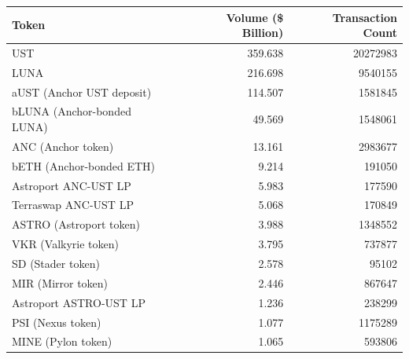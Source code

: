 \begin{center}
    \begin{tabular}{lrr}
        \toprule
        Token                      & Volume (\$ Billion) & Transaction Count \\
        \midrule
        UST                        & 359.638             & 20272983          \\
        LUNA                       & 216.698             & 9540155           \\
        aUST (Anchor UST deposit)  & 114.507             & 1581845           \\
        bLUNA (Anchor-bonded LUNA) & 49.569              & 1548061           \\
        ANC (Anchor token)         & 13.161              & 2983677           \\
        bETH (Anchor-bonded ETH)   & 9.214               & 191050            \\
        Astroport ANC-UST LP       & 5.983               & 177590            \\
        Terraswap ANC-UST LP       & 5.068               & 170849            \\
        ASTRO (Astroport token)    & 3.988               & 1348552           \\
        VKR (Valkyrie token)       & 3.795               & 737877            \\
        SD (Stader token)          & 2.578               & 95102             \\
        MIR (Mirror token)         & 2.446               & 867647            \\
        Astroport ASTRO-UST LP     & 1.236               & 238299            \\
        PSI (Nexus token)          & 1.077               & 1175289           \\
        MINE (Pylon token)         & 1.065               & 593806            \\
        \bottomrule
    \end{tabular}
\end{center}
